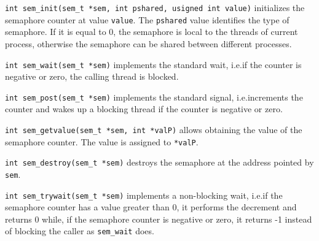 \begin{description}
\item \texttt{int sem\_init(sem\_t *sem, int pshared, usigned int value)} initializes the semaphore counter at value \texttt{value}. The \texttt{pshared} value identifies the type of semaphore. If it is equal to 0, the semaphore is local to the threads of current process, otherwise the semaphore can be shared between different processes.

\item \texttt{int sem\_wait(sem\_t *sem)} implements the standard wait, i.e.\@ if the counter is negative or zero, the calling thread is blocked.

\item \texttt{int sem\_post(sem\_t *sem)} implements the standard signal, i.e.\@ increments the counter and wakes up a blocking thread if the counter is negative or zero.

\item \texttt{int sem\_getvalue(sem\_t *sem, int *valP)} allows obtaining the value of the semaphore counter. The value is assigned to \texttt{*valP}.

\item \texttt{int sem\_destroy(sem\_t *sem)} destroys the semaphore at the address pointed by \texttt{sem}.

\item \texttt{int sem\_trywait(sem\_t *sem)} implements a non-blocking wait, i.e.\@ if the semaphore counter has a value greater than 0, it performs the decrement and returns 0 while, if the semaphore counter is negative or zero, it returns -1 instead of blocking the caller as \texttt{sem\_wait} does.
\end{description}

